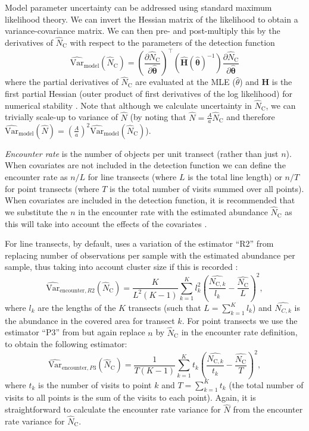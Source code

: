 \documentclass[article]{jss}\usepackage[]{graphicx}\usepackage[]{color}
\begin{document}
Model parameter uncertainty can be addressed using standard maximum likelihood theory. We can invert the Hessian matrix of the likelihood to obtain a variance-covariance matrix. We can then pre- and post-multiply this by the derivatives of $\hat{N}_\text{C}$ with respect to the parameters of the detection function
$$
\widehat{\text{Var}}_\text{model}\left( \hat{N}_\text{C}\right) = \left(\frac{\partial \hat{N}_\text{C}}{\partial\hat{\boldsymbol{\theta}}}\right)^\top \left(\hat{\mathbf{H}}(\hat{\boldsymbol{\theta}})^{-1} \right)\frac{\partial \hat{N}_\text{C}}{\partial\hat{\boldsymbol{\theta}}}
$$
where the partial derivatives of $\hat{N}_\text{C}$ are evaluated at the MLE ($\hat{\theta}$) and $\mathbf{H}$ is the first partial Hessian (outer product of first derivatives of the log likelihood) for numerical stability \citep[][p 62]{Buckland:2001vm}. Note that although we calculate uncertainty in $\hat{N}_\text{C}$, we can trivially scale-up to variance of $\hat{N}$ (by noting that $\hat{N} = \frac{A}{a} \hat{N}_\text{C}$ and therefore $\widehat{\text{Var}}_\text{model}\left(\hat{N}\right) = \left( \frac{A}{a} \right)^2 \widehat{\text{Var}}_\text{model} \left(\hat{N}_\text{C} \right)$).

\textit{Encounter rate} is the number of objects per unit transect (rather than just $n$). When covariates are not included in the detection function we can define the encounter rate as $n/L$ for line transects (where $L$ is the total line length) or $n/T$ for point transects (where $T$ is the total number of visits summed over all points). When covariates are included in the detection function, it is recommended that we substitute the $n$ in the encounter rate with the estimated abundance $\hat{N}_\text{C}$ as this will take into account the effects of the covariates \citep{Innes:2002ka}.

For line transects, by default,  uses a variation of the estimator ``R2'' from \cite{Fewster:2009ku} replacing number of observations per sample with the estimated abundance per sample, thus taking into account cluster size if this is recorded \citep{Innes:2002ka, Marques:2003vb}:
$$
\widehat{\text{Var}}_{\text{encounter},R2}\left( \hat{N}_\text{C}\right) = \frac{K}{L^2(K-1)} \sum_{k=1}^{K} l_k^2 \left( \frac{\hat{N_{\text{C}, k}}}{l_k} - \frac{\hat{N_\text{C}}}{L}\right)^2,
$$
where $l_k$ are the lengths of the $K$ transects (such that $L = \sum_{k=1}^K l_k$) and $\hat{N_{C,k}}$ is the abundance in the covered area for transect $k$. For point transects we use the estimator ``P3'' from \cite{Fewster:2009ku} but again replace $n$ by $\hat{N}_\text{C}$ in the encounter rate definition, to obtain the following estimator:
$$
\widehat{\text{Var}}_{\text{encounter},P3}\left( \hat{N}_\text{C}\right) = \frac{1}{T(K-1)} \sum_{k=1}^{K} t_k \left( \frac{\hat{N_{\text{C}, k}}}{t_k} - \frac{\hat{N_\text{C}}}{T}\right)^2,
$$
where $t_k$ is the number of visits to point $k$ and $T = \sum_{k=1}^K t_k$ (the total number of visits to all points is the sum of the visits to each point). Again, it is straightforward to calculate the encounter rate variance for $\hat{N}$ from the encounter rate variance for $\hat{N}_\text{C}$.
\end{document}
